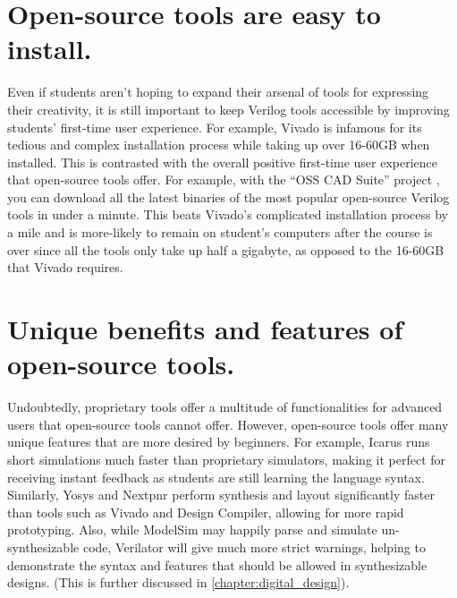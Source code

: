\section{Open-source tools are easy to install.}

Even if students aren't hoping to expand their arsenal of tools for expressing their creativity, it is still important to keep Verilog tools accessible by improving students' first-time user experience. For example, Vivado is infamous for its tedious and complex installation process while taking up over 16-60GB when installed. This is contrasted with the overall positive first-time user experience that open-source tools offer. For example, with the \enquote{OSS CAD Suite} project \cite{osscadsuitebuildGitHub}, you can download all the latest binaries of the most popular open-source Verilog tools in under a minute. This beats Vivado's complicated installation process by a mile and is more-likely to remain on student's computers after the course is over since all the tools only take up half a gigabyte, as opposed to the 16-60GB that Vivado requires.

\section{Unique benefits and features of open-source tools.}

Undoubtedly, proprietary tools offer a multitude of functionalities for advanced users that open-source tools cannot offer. However, open-source tools offer many unique features that are more desired by beginners. For example, Icarus runs short simulations much faster than proprietary simulators, making it perfect for receiving instant feedback as students are still learning the language syntax. Similarly, Yosys and Nextpnr perform synthesis and layout significantly faster than tools such as Vivado and Design Compiler, allowing for more rapid prototyping. Also, while ModelSim may happily parse and simulate un-synthesizable code, Verilator will give much more strict warnings, helping to demonstrate the syntax and features that should be allowed in synthesizable designs. (This is further discussed in \autoref{chapter:digital_design}).

